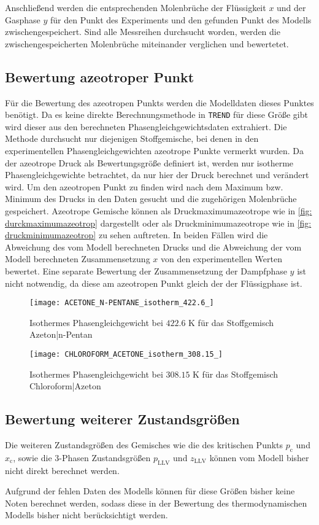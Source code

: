 \documentclass[../thesis.tex]{subfiles}
\begin{document}
Anschließend werden die entsprechenden Molenbrüche der Flüssigkeit $x$ und der Gasphase $y$ für den Punkt des Experiments und den gefunden Punkt des Modells zwischengespeichert. Sind alle Messreihen durchsucht worden, werden die zwischengespeicherten Molenbrüche miteinander verglichen und bewertetet.

\subsection{Bewertung azeotroper Punkt}

Für die Bewertung des azeotropen Punkts werden die Modelldaten dieses Punktes benötigt. Da es keine direkte Berechnungsmethode in \texttt{TREND} für diese Größe gibt wird dieser aus den berechneten Phasengleichgewichtsdaten extrahiert. Die Methode durchsucht nur diejenigen Stoffgemische, bei denen in den experimentellen Phasengleichgewichten azeotrope Punkte vermerkt wurden. Da der azeotrope Druck als Bewertungsgröße definiert ist, werden nur isotherme Phasengleichgewichte betrachtet, da nur hier der Druck berechnet und verändert wird. Um den azeotropen Punkt zu finden wird nach dem Maximum bzw. Minimum des Drucks in den Daten gesucht und die zugehörigen Molenbrüche gespeichert. Azeotrope Gemische können als Druckmaximumazeotrope wie in \autoref{fig: durckmaximumazeotrop} dargestellt oder als Druckminimumazeotrope wie in \autoref{fig: druckminimumazeotrop} zu sehen auftreten. In beiden Fällen wird die Abweichung des vom Modell berechneten Drucks und die Abweichung der vom Modell berechneten Zusammensetzung $x$ von den experimentellen Werten bewertet. Eine separate Bewertung der Zusammensetzung der Dampfphase $y$ ist nicht notwendig, da diese am azeotropen Punkt gleich der der Flüssigphase ist. 

\begin{figure}[htb]
	\centering
	\texttt{[image: ACETONE\_N-PENTANE\_isotherm\_422.6\_]}
	\caption{Isothermes Phasengleichgewicht bei $ 422$.$6$ K für das Stoffgemisch Azeton|n-Pentan}
	\label{fig: durckmaximumazeotrop}
\end{figure}

\begin{figure}[hbt]
	\centering
	\texttt{[image: CHLOROFORM\_ACETONE\_isotherm\_308.15\_]}
	\caption{Isothermes Phasengleichgewicht bei $ 308$.$15$ K für das Stoffgemisch Chloroform|Azeton}
	\label{fig: druckminimumazeotrop}
\end{figure}

\subsection{Bewertung weiterer Zustandsgrößen}

Die weiteren Zustandsgrößen des Gemisches wie die des kritischen Punkts $ p_{\mathrm{c}}$ und $ x_{\mathrm{c}}$, sowie die 3-Phasen Zustandsgrößen $p_{\mathrm{LLV}}$ und $z_{\mathrm{LLV}}$ können vom Modell bisher nicht direkt berechnet werden.

Aufgrund der fehlen Daten des Modells können für diese Größen bisher keine Noten berechnet werden, sodass diese in der Bewertung des thermodynamischen Modells bisher nicht berücksichtigt werden.
\end{document}
